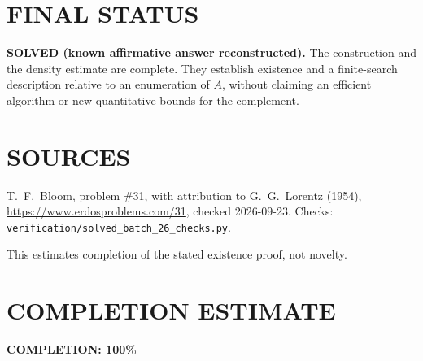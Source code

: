 \section{FINAL STATUS}
\textbf{SOLVED (known affirmative answer reconstructed).}
The construction and the density estimate are complete. They establish
existence and a finite-search description relative to an enumeration
of $A$, without claiming an efficient algorithm or new quantitative
bounds for the complement.

\section{SOURCES}
T.~F.~Bloom, problem \#31, with attribution to G.~G.~Lorentz (1954),
\url{https://www.erdosproblems.com/31}, checked 2026-09-23.
Checks: \texttt{verification/solved\_batch\_26\_checks.py}.

This estimates completion of the stated existence proof, not novelty.

\section{COMPLETION ESTIMATE}
\textbf{COMPLETION: 100\%}
